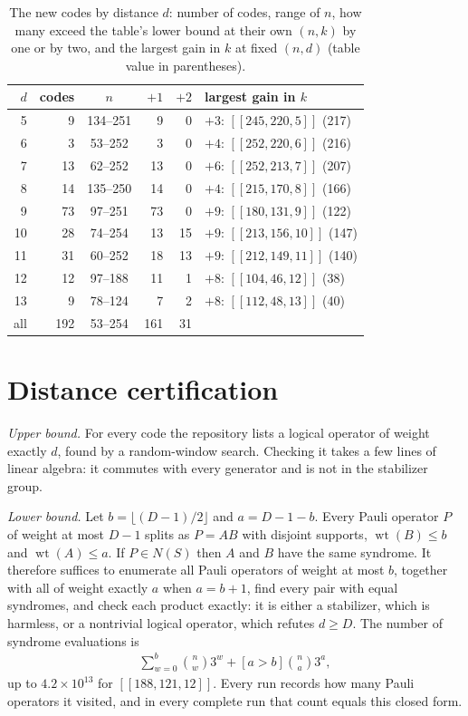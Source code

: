 \documentclass[reprint,pra,superscriptaddress,nofootinbib]{revtex4-2}
\newcommand{\wt}{\operatorname{wt}}
\begin{document}
\begin{table}[t]
\caption{The new codes by distance $d$: number of codes, range of $n$, how many exceed the table's lower bound at their
own $(n,k)$ by one or by two, and the largest gain in $k$ at fixed $(n,d)$ (table value in parentheses).}
\label{tab:summary}
\begin{ruledtabular}
\begin{tabular}{rrcrrl}
$d$ & codes & $n$ & $+1$ & $+2$ & largest gain in $k$ \\
\hline
5  &   9 & 134--251 &  9 &  0 & $+3$: $[[245,220,5]]$ (217) \\
6  &   3 &  53--252 &  3 &  0 & $+4$: $[[252,220,6]]$ (216) \\
7  &  13 &  62--252 & 13 &  0 & $+6$: $[[252,213,7]]$ (207) \\
8  &  14 & 135--250 & 14 &  0 & $+4$: $[[215,170,8]]$ (166) \\
9  &  73 &  97--251 & 73 &  0 & $+9$: $[[180,131,9]]$ (122) \\
10 &  28 &  74--254 & 13 & 15 & $+9$: $[[213,156,10]]$ (147) \\
11 &  31 &  60--252 & 18 & 13 & $+9$: $[[212,149,11]]$ (140) \\
12 &  12 &  97--188 & 11 &  1 & $+8$: $[[104,46,12]]$ (38) \\
13 &   9 &  78--124 &  7 &  2 & $+8$: $[[112,48,13]]$ (40) \\
\hline
all & 192 & 53--254 & 161 & 31 & \\
\end{tabular}
\end{ruledtabular}
\end{table}

\section{Distance certification}\label{sec:certification}

\emph{Upper bound.} For every code the repository lists a logical operator of weight exactly $d$, found by a
random-window search. Checking it takes a few lines of linear algebra: it commutes with every generator and is not in
the stabilizer group.

\emph{Lower bound.} Let $b=\lfloor (D-1)/2\rfloor$ and $a=D-1-b$. Every Pauli operator $P$ of weight at most $D-1$ splits as $P=AB$ with disjoint supports, $\wt(B)\le b$ and $\wt(A)\le a$. If $P\in N(S)$ then $A$ and $B$ have the same syndrome. It therefore suffices to enumerate all Pauli operators of weight at most $b$, together with all of weight exactly $a$ when $a=b+1$, find every pair with equal syndromes, and check each product exactly: it is either a stabilizer, which is harmless, or a nontrivial logical operator, which refutes $d\ge D$. The number of syndrome evaluations is
\begin{align}
\sum_{w=0}^{b}\binom{n}{w}3^{w}+[a>b]\binom{n}{a}3^{a},\label{eq:cost}
\end{align} up to $4.2\times10^{13}$ for $[[188,121,12]]$. Every run records how many Pauli operators it visited, and in every complete run that count equals this closed form.
\end{document}
